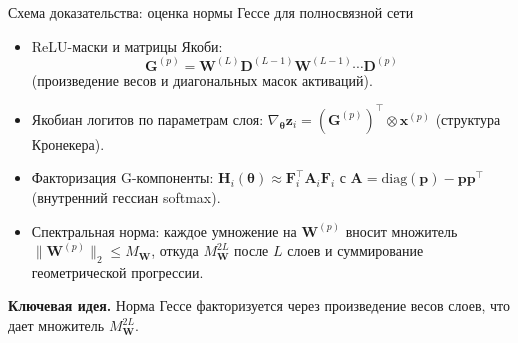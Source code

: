 \documentclass[10pt,pdf,hyperref={unicode}]{beamer}
\newcommand{\key}[1]{\textbf{\color{darkgreen}#1}}
\begin{document}
\begin{frame}{Схема доказательства: оценка нормы Гессе для полносвязной сети}
\justifying
\footnotesize
\begin{itemize}
    \item ReLU-маски и матрицы Якоби:
    \[
        \mathbf{G}^{(p)} = \mathbf{W}^{(L)}\mathbf{D}^{(L-1)}\mathbf{W}^{(L-1)}\cdots\mathbf{D}^{(p)}
    \]
    (произведение весов и диагональных масок активаций).
    \item Якобиан логитов по параметрам слоя: $\nabla_{\boldsymbol{\theta}}\mathbf{z}_i = (\mathbf{G}^{(p)})^\top \otimes \mathbf{x}^{(p)}$ (структура Кронекера).
    \item Факторизация G-компоненты: $\mathbf{H}_i(\boldsymbol{\theta}) \approx \mathbf{F}_i^{\top}\mathbf{A}_i\mathbf{F}_i$ с $\mathbf{A} = \mathrm{diag}(\mathbf{p})-\mathbf{p}\mathbf{p}^{\top}$ (внутренний гессиан softmax).
    \item Спектральная норма: каждое умножение на $\mathbf{W}^{(p)}$ вносит множитель $\|\mathbf{W}^{(p)}\|_2 \leqslant M_{\mathbf{W}}$, откуда $M_{\mathbf{W}}^{2L}$ после $L$ слоев и суммирование геометрической прогрессии.
\end{itemize}

\vspace{0.15em}
\key{Ключевая идея.} Норма Гессе факторизуется через произведение весов слоев, что дает множитель $M_{\mathbf{W}}^{2L}$.
\end{frame}
\end{document}
